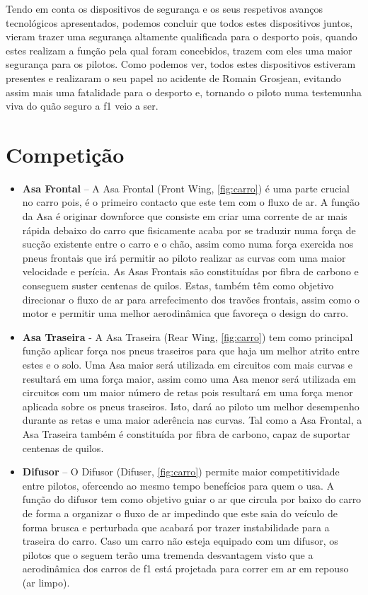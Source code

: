 \documentclass{report}
\begin{document}
Tendo em conta os dispositivos de segurança e os seus respetivos avanços tecnológicos apresentados, podemos concluir que todos estes dispositivos juntos, vieram trazer uma segurança altamente qualificada para o desporto pois, quando estes realizam a função pela qual foram concebidos, trazem com eles uma maior segurança para os pilotos. Como podemos ver, todos estes dispositivos estiveram presentes e realizaram o seu papel no acidente de Romain Grosjean, evitando assim mais uma fatalidade para o desporto e, tornando o piloto numa testemunha viva do quão seguro a \ac{f1} veio a ser.
	
\section{Competição}

\begin{itemize}

\item \textbf{Asa Frontal} – A Asa Frontal (Front Wing, \autoref{fig:carro}) é uma parte crucial no carro pois, é o primeiro contacto que este tem com o fluxo de ar. A função da Asa é originar downforce que consiste em criar uma corrente de ar mais rápida debaixo do carro que fisicamente acaba por se traduzir numa força de sucção existente entre o carro e o chão, assim como numa força exercida nos pneus frontais que irá permitir ao piloto realizar as curvas com uma maior velocidade e perícia.
As Asas Frontais são constituídas por fibra de carbono e conseguem suster centenas de quilos. Estas, também têm como objetivo direcionar o fluxo de ar para arrefecimento dos travões frontais, assim como o motor e permitir uma melhor aerodinâmica que favoreça o design do carro.

\item \textbf{Asa Traseira} - A Asa Traseira (Rear Wing, \autoref{fig:carro}) tem como principal função aplicar força nos pneus traseiros para que haja um melhor atrito entre estes e o solo. Uma Asa maior será utilizada em circuitos com mais curvas e resultará em uma força maior, assim como uma Asa menor será utilizada em circuitos com um maior número de retas pois resultará em uma força menor aplicada sobre os pneus traseiros. Isto, dará ao piloto um melhor desempenho durante as retas e uma maior aderência nas curvas.  Tal como a Asa Frontal, a Asa Traseira também é constituída por fibra de carbono, capaz de suportar centenas de quilos.

\item \textbf{Difusor} – O Difusor (Difuser, \autoref{fig:carro}) permite maior competitividade entre pilotos, ofercendo ao mesmo tempo benefícios para quem o usa. A função do difusor tem como objetivo guiar o ar que circula por baixo do carro de forma a organizar o fluxo de ar impedindo que este saia do veículo de forma brusca e perturbada que acabará por trazer instabilidade para a traseira do carro. Caso um carro não esteja equipado com um difusor, os pilotos que o seguem terão uma tremenda desvantagem visto que a aerodinâmica dos carros de \ac{f1} está projetada para correr em ar em repouso (ar limpo).\\[0.7cm]


\end{itemize}
\end{document}

